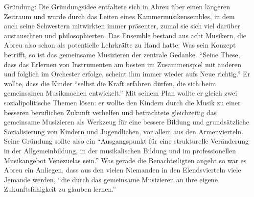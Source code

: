 Gründung: Die Gründungsidee entfaltete sich in Abreu über einen längeren
Zeitraum und wurde durch das Leiten eines Kammermusikensembles, in dem auch
seine Schwestern mitwirkten immer präsenter, zumal sie sich viel darüber
austauschten und philosophierten. Das Ensemble bestand aus acht Musikern, die
Abreu also schon als potentielle Lehrkräfte zu Hand hatte.
\autocite[34]{kaufmann:el_sistema} Was sein Konzept betrifft, so ist das
gemeinsame Musizieren der zentrale Gedanke. \enquote{Seine These, dass das
Erlernen von Instrumenten am besten im Zusammenspiel mit anderen und folglich im
Orchester erfolge, scheint ihm immer wieder aufs Neue
richtig.}\autocite[34]{kaufmann:el_sistema} Er wollte, dass die Kinder
\enquote{selbst die Kraft erfahren dürfen, die sich beim gemeinsamen Musikmachen
entwickelt.}\autocite[34]{kaufmann:el_sistema} Mit seinem Plan wollte er gleich
zwei sozialipolitische Themen lösen: er wollte den Kindern durch die Musik zu
einer besseren beruflichen Zukunft verhelfen und betrachtete gleichzeitig das
gemeinsame Musizieren als Werkzeug für eine bessere Bildung und grundsätzliche
Sozialisierung von Kindern und Jugendlichen, vor allem aus den Armenvierteln.
Seine Gründung sollte also ein \enquote{Ausgangspunkt für eine strukturelle
Veränderung in der Allgemeinbildung, in der musikalischen Bildung und im
professionellen Musikangebot Venezuelas sein.}\autocite[38]{kaufmann:el_sistema}
Was gerade die Benachteiligten angeht so war es Abreu ein Anliegen, dass aus den
vielen Niemanden in den Elendsvierteln viele Jemande werden, \enquote{die durch
das gemeinsame Musizieren an ihre eigene Zukunftsfähigkeit zu glauben
lernen.}\autocite[39]{kaufmann:el_sistema}

